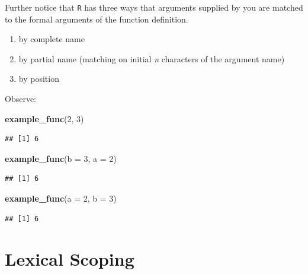 \documentclass[
]{book}
\newenvironment{Shaded}{\begin{snugshade}}{\end{snugshade}}
\newcommand{\DataTypeTok}[1]{\textcolor[rgb]{0.13,0.29,0.53}{#1}}
\newcommand{\DecValTok}[1]{\textcolor[rgb]{0.00,0.00,0.81}{#1}}
\newcommand{\KeywordTok}[1]{\textcolor[rgb]{0.13,0.29,0.53}{\textbf{#1}}}
\newcommand{\NormalTok}[1]{#1}
\begin{document}
Further notice that \texttt{R} has three ways that arguments supplied by you are matched to the formal arguments of the function definition.

\begin{enumerate}
\def\labelenumi{\arabic{enumi})}
\item
  by complete name
\item
  by partial name (matching on initial \emph{n} characters of the argument name)
\item
  by position
\end{enumerate}

Observe:

\begin{Shaded}
\begin{Highlighting}[]
\KeywordTok{example_func}\NormalTok{(}\DecValTok{2}\NormalTok{, }\DecValTok{3}\NormalTok{)}
\end{Highlighting}
\end{Shaded}

\begin{verbatim}
## [1] 6
\end{verbatim}

\begin{Shaded}
\begin{Highlighting}[]
\KeywordTok{example_func}\NormalTok{(}\DataTypeTok{b =} \DecValTok{3}\NormalTok{, }\DataTypeTok{a =} \DecValTok{2}\NormalTok{)}
\end{Highlighting}
\end{Shaded}

\begin{verbatim}
## [1] 6
\end{verbatim}

\begin{Shaded}
\begin{Highlighting}[]
\KeywordTok{example_func}\NormalTok{(}\DataTypeTok{a =} \DecValTok{2}\NormalTok{, }\DataTypeTok{b =} \DecValTok{3}\NormalTok{)}
\end{Highlighting}
\end{Shaded}

\begin{verbatim}
## [1] 6
\end{verbatim}

\hypertarget{lexical-scoping}{%
\section{Lexical Scoping}\label{lexical-scoping}}
\end{document}
